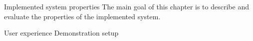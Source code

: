 \chap Implemented system properties
The main goal of this chapter is to describe and evaluate the properties of the implemented system.

\sec User experience
\sec Demonstration setup